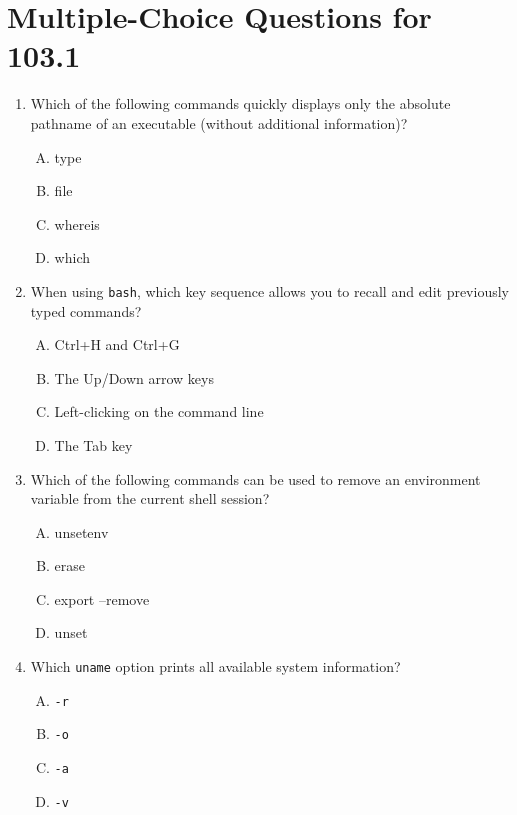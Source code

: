 \documentclass[a4paper]{report}
\begin{document}
\section*{Multiple-Choice Questions for 103.1}
\begin{enumerate}[1.]

    \item Which of the following commands quickly displays only the absolute pathname of an executable (without additional information)?  
    \begin{enumerate}[A)]
        \item type  
        \item file  
        \item whereis  
        \item which  
    \end{enumerate}

    \item When using \texttt{bash}, which key sequence allows you to recall and edit previously typed commands?  
    \begin{enumerate}[A)]
        \item Ctrl+H and Ctrl+G  
        \item The Up/Down arrow keys  
        \item Left-clicking on the command line  
        \item The Tab key  
    \end{enumerate}

    \item Which of the following commands can be used to remove an environment variable from the current shell session?  
    \begin{enumerate}[A)]
        \item unsetenv  
        \item erase  
        \item export --remove  
        \item unset  
    \end{enumerate}

    \item Which \texttt{uname} option prints all available system information?  
    \begin{enumerate}[A)]
        \item \texttt{-r}  
        \item \texttt{-o}  
        \item \texttt{-a}  
        \item \texttt{-v}  
    \end{enumerate}


\end{enumerate}
\end{document}
